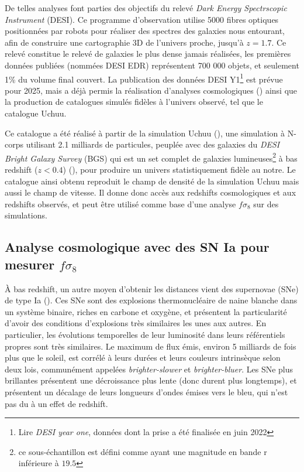 \documentclass{book}
\begin{document}
De telles analyses font parties des objectifs du relevé \textit{Dark Energy Spectrscopic Instrument} (DESI). Ce programme d'observation utilise 5000 fibres optiques positionnées par robots pour réaliser des spectres des galaxies nous entourant, afin de construire une cartographie 3D de l'univers proche, jusqu'à $z=1.7$. Ce relevé constitue le relevé de galaxies le plus dense jamais réalisées, les premières données publiées (nommées DESI EDR) représentent 700 000 objets, et seulement 1\% du volume final couvert. La publication des données DESI Y1\footnote{Lire \textit{DESI year one}, données dont la prise a été finalisée en juin 2022} est prévue pour 2025, mais a déjà permis la réalisation d'analyses cosmologiques (\cite{desi_collaboration_desi_2024, desi_collaboration_desi_2024-1, desi_collaboration_desi_2024-2}) ainsi que la production de catalogues simulés fidèles à l'univers observé, tel que le catalogue Uchuu.

Ce catalogue a été réalisé à partir de la simulation Uchuu (\cite{prada_desi_2023}), une simulation à N-corps utilisant 2.1 milliards de particules, peuplée avec des galaxies du \textit{DESI Bright Galaxy Survey} (BGS) qui est un set complet de galaxies lumineuses\footnote{ce sous-échantillon est défini comme ayant une magnitude en bande r inférieure à $19.5$} à bas redshift ($z<0.4$) (\cite{hahn_desi_2023}), pour produire un univers statistiquement fidèle au notre. Le catalogue ainsi obtenu reproduit le champ de densité de la simulation Uchuu mais aussi le champ de vitesse. Il donne donc accès aux redshifts cosmologiques et aux redshifts observés, et peut être utilisé comme base d'une analyse $f\sigma_8$ sur des simulations.


\subsection{Analyse cosmologique avec des SN Ia pour mesurer $f\sigma_8$}

À bas redshift, un autre moyen d'obtenir les distances vient des supernovae (SNe) de type Ia (\cite{hoyle_nucleosynthesis_1960}). Ces SNe sont des explosions thermonucléaire de naine blanche dans un système binaire, riches en carbone et oxygène, et présentent la particularité d’avoir des conditions d'explosions très similaires les unes aux autres. En particulier, les évolutions temporelles de leur luminosité dans leurs référentiels propres sont très similaires. Le maximum de flux émis, environ 5 milliards de fois plus que le soleil, est corrélé à leurs durées et leurs couleurs intrinsèque selon deux lois, communément appelées \textit{brighter-slower} et \textit{brighter-bluer}. Les SNe plus brillantes présentent une décroissance plus lente (donc durent plus longtemps), et présentent un décalage de leurs longueurs d'ondes émises vers le bleu, qui n'est pas du à un effet de redshift.
\end{document}
